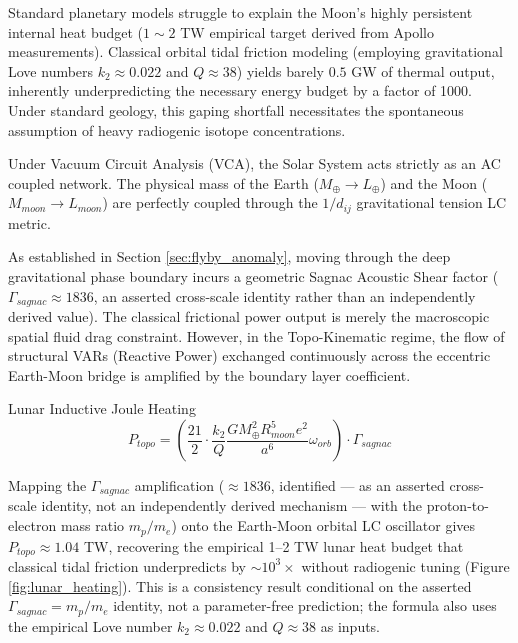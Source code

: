 Standard planetary models struggle to explain the Moon's highly persistent internal heat budget ($1 \sim 2$ TW empirical target derived from Apollo measurements). Classical orbital tidal friction modeling (employing gravitational Love numbers $k_2 \approx 0.022$ and $Q \approx 38$) yields barely $0.5$ GW of thermal output, inherently underpredicting the necessary energy budget by a factor of 1000. Under standard geology, this gaping shortfall necessitates the spontaneous assumption of heavy radiogenic isotope concentrations.

Under Vacuum Circuit Analysis (VCA), the Solar System acts strictly as an AC coupled network. The physical mass of the Earth ($M_\oplus \to L_\oplus$) and the Moon ($M_{moon} \to L_{moon}$) are perfectly coupled through the $1/d_{ij}$ gravitational tension LC metric. 

As established in Section \ref{sec:flyby_anomaly}, moving through the deep gravitational phase boundary incurs a geometric Sagnac Acoustic Shear factor ($\Gamma_{sagnac} \approx 1836$, an asserted cross-scale identity rather than an independently derived value). The classical frictional power output is merely the macroscopic spatial fluid drag constraint. However, in the Topo-Kinematic regime, the flow of structural VARs (Reactive Power) exchanged continuously across the eccentric Earth-Moon bridge is amplified by the boundary layer coefficient.

\begin{resultbox}{Lunar Inductive Joule Heating}
\begin{equation}
    P_{topo} = \left( \frac{21}{2} \cdot \frac{k_2}{Q} \frac{G M_\oplus^2 R_{moon}^5 e^2}{a^6} \omega_{orb} \right) \cdot \Gamma_{sagnac}
\end{equation}
\end{resultbox}

Mapping the $\Gamma_{sagnac}$ amplification ($\approx 1836$, identified --- as an asserted cross-scale identity, not an independently derived mechanism --- with the proton-to-electron mass ratio $m_p/m_e$) onto the Earth-Moon orbital LC oscillator gives $P_{topo} \approx 1.04$ TW, recovering the empirical 1--2 TW lunar heat budget that classical tidal friction underpredicts by $\sim 10^3\times$ without radiogenic tuning (Figure \ref{fig:lunar_heating}). This is a consistency result conditional on the asserted $\Gamma_{sagnac} = m_p/m_e$ identity, not a parameter-free prediction; the formula also uses the empirical Love number $k_2 \approx 0.022$ and $Q \approx 38$ as inputs.

